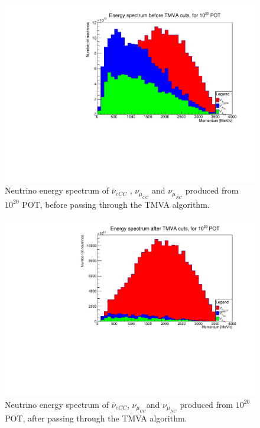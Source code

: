 \begin{figure}[h!]
\centering
\includegraphics[width=.9\textwidth]{figures/NeutrinoChap/ActualNeutrinoEvents.pdf}
\caption{Neutrino energy spectrum of $\bar{\nu}_{eCC}$ , $\nu_{\mu_{CC}}$ and $\nu_{\mu_{NC}}$ produced from $10^{20}$ POT, before passing through the TMVA algorithm.}
\label{fig:TMVAEspectrumBefore}
\end{figure}


\begin{figure}[h!]
\centering
\includegraphics[width=.9\textwidth]{figures/NeutrinoChap/ActualNeutrinoEventsAfter.pdf}
\caption{Neutrino energy spectrum of $\bar{\nu}_{eCC}$, $\nu_{\mu_{CC}}$and $\nu_{\mu_{NC}}$ produced from $10^{20}$ POT, after passing through the TMVA algorithm.}
\label{fig:TMVAEspectrumAfter}
\end{figure}

